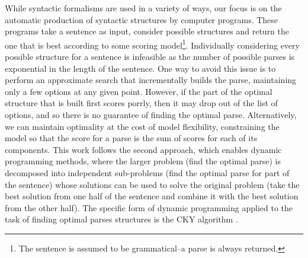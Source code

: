 
While syntactic formalisms are used in a variety of ways, our focus is on the automatic production of syntactic structures by computer programs.
These programs take a sentence as input, consider possible structures and return the one that is best according to some scoring model\footnote{The sentence is assumed to be grammatical--a parse is always returned.}.
Individually considering every possible structure for a sentence is infeasible as the number of possible parses is exponential in the length of the sentence.
One way to avoid this issue is to perform an approximate search that incrementally builds the parse, maintaining only a few options at any given point.
However, if the part of the optimal structure that is built first scores porrly, then it may drop out of the list of options, and so there is no guarantee of finding the optimal parse.
Alternatively, we can maintain optimality at the cost of model flexibility, constraining the model so that the score for a parse is the sum of scores for each of its components.
This work follows the second approach, which enables dynamic programming methods, where the larger problem (find the optimal parse) is decomposed into independent sub-problems (find the optimal parse for part of the sentence) whose solutions can be used to solve the original problem (take the best solution from one half of the sentence and combine it with the best solution from the other half).
The specific form of dynamic programming applied to the task of finding optimal parses structures is the CKY algorithm \parencite{Cocke:1969,Kasami:1966,Younger:1967}.

